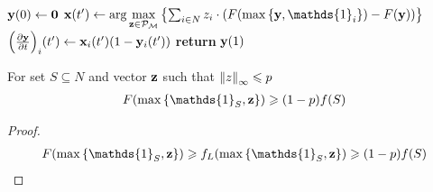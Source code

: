 
\begin{algorithm}
	\caption{}\label{alg:measured_cont_greedy}
	\begin{algorithmic}[1]
		\State $\vb{y}(0) \gets \vb{0}$
		\State $\vb{x}(t') \gets \arg \max\limits_{\vb{z} \in \mathcal{P}_\mathcal{M}} \qty{\sum_{i \in N} z_i\cdot \qty( F\qty(\max\qty{\vb{y}, \mathds{1}_i})-F(\vb{y}))} $
		\State $\qty(\pdv{\vb{y}}{t})_i\qty(t') \gets \vb{x}_i(t') \qty(1-\vb{y}_i(t'))$
		\EndFor
		\State \textbf{return} $\vb{y}(1)$
		\EndProcedure
	\end{algorithmic}
\end{algorithm}

\begin{lemma} \label{bound_random}
	For set $S\subseteq N$ and vector $\vb{z}$ such that $\norm{z}_\infty \leqslant p$
	\begin{align}
	F(\max\qty{\mathds{1}_S , \vb{z}}) \geqslant (1-p) f(S)
	\end{align}
	\begin{proof}
		\begin{align}
		F(\max\qty{\mathds{1}_S , \vb{z}}) \geqslant f_L(\max\qty{\mathds{1}_S , \vb{z}}) \geqslant (1-p)f(S)
		\end{align}
	\end{proof}
\end{lemma}
